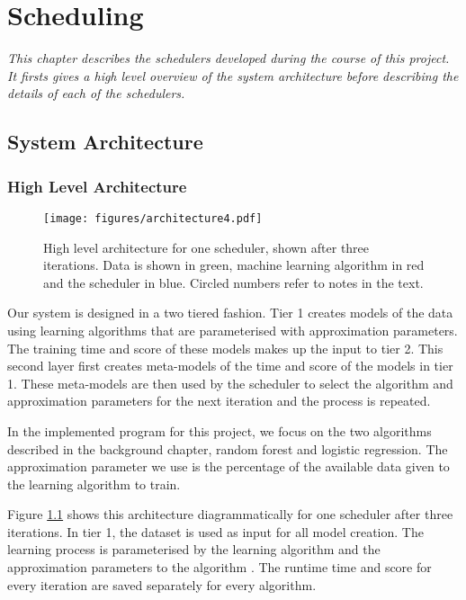 \documentclass[a4paper,12pt,twoside,openright]{report}
\begin{document}
\chapter{Scheduling} 
\textit{This chapter describes the schedulers developed during the course of this project. It firsts gives a high level overview of the system architecture before describing the details of each of the schedulers.}

\section{System Architecture}

\subsection{High Level Architecture}
\begin{figure}[p]
    \centerline{\texttt{[image: figures/architecture4.pdf]}}
  \caption{High level architecture for one scheduler, shown after three iterations. Data is shown in green, machine learning algorithm in red and the scheduler in blue. Circled numbers refer to notes in the text.}
    \label{architecture}
\end{figure}


Our system is designed in a two tiered fashion. Tier 1 creates models of the data using learning algorithms that are parameterised with approximation parameters. The training time and score of these models makes up the input to tier 2. This second layer first creates meta-models of the time and score of the models in tier 1. These meta-models are then used by the scheduler to select the algorithm and approximation parameters for the next iteration and the process is repeated.

In the implemented program for this project, we focus on the two algorithms described in the background chapter, random forest and logistic regression. The approximation parameter we use is the percentage of the available data given to the learning algorithm to train.

Figure \ref{architecture} shows this architecture diagrammatically for one scheduler after three iterations. In tier 1, the dataset \raisebox{.5pt}{\textcircled{\raisebox{-.9pt} {1}}} is used as input for all model creation. The learning process is parameterised by the learning algorithm and the approximation parameters to the algorithm \raisebox{.5pt}{\textcircled{\raisebox{-.9pt} {2}}}. The runtime time and score for every iteration are saved \raisebox{.5pt}{\textcircled{\raisebox{-.9pt} {3}}} separately for every algorithm.
\end{document}
